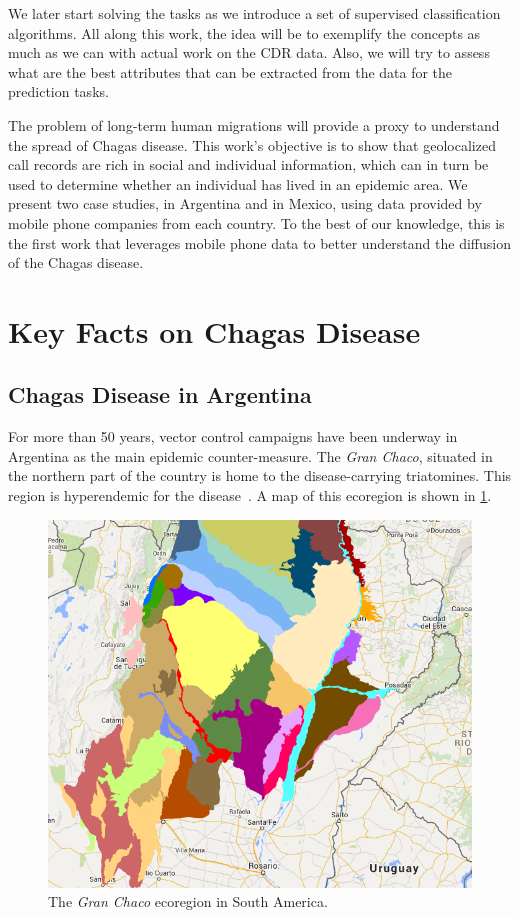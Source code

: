 We later start solving the tasks as we introduce a set of supervised classification algorithms.
All along this work, the idea will be to exemplify the concepts as much as we can with actual work on the CDR data.
Also, we will try to assess what are the best attributes that can be extracted from the data for the prediction tasks.

The problem of long-term human migrations will provide a proxy to understand the spread of Chagas disease.
This work's objective is to show that geolocalized call records are rich in social and individual information, which can in turn be used to determine whether an individual has lived in an epidemic area.
We present two case studies, in Argentina and in Mexico, using data provided by mobile phone companies from each country. %
To the best of our knowledge, this is the first work that leverages mobile phone data to better understand the diffusion of the Chagas disease.


\section{Key Facts on Chagas Disease}

\subsection{Chagas Disease in  Argentina}\label{endemic_zone_argentina}

For more than 50 years, vector control campaigns have been underway in Argentina as the main epidemic counter-measure.
The \textit{Gran Chaco}, situated in the northern part of the country is home to the disease-carrying triatomines.
This region is hyperendemic for the disease~\citep{OPS2014mapa}.
A map of this ecoregion is shown in \cref{fig:granchaco}.

\begin{figure}[ht]
\centering
\includegraphics[width=0.75\columnwidth]{figures/Ambientes_GranChaco_TNC-Argentina/Ambientes_GranChaco_TNC-Argentina.png}
\caption{The \textit{Gran Chaco} ecoregion in South America.%
}
\label{fig:granchaco}
\end{figure}

